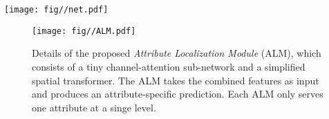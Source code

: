 \documentclass[10pt,twocolumn,letterpaper]{article}
\begin{document}
\begin{figure*}[t]
  \begin{center}
    \texttt{[image: fig//net.pdf]}
  \end{center}
  \vspace{-1mm}
     \caption{Overview of the proposed framework.
     The input pedestrian image is fed into the main network with both bottom-up and top-down pathways.
     Features combined from different levels are fed into multiple \textit{Attribute Localization Modules} (Figure \ref{fig:ALM}),
     which perform attribute-specific localization and region-based feature learning.
     Outputs from different branches are trained with \textit{deep supervision} and aggregated through an element-wise maximum operation for inference.
      is the total number of attributes. Best viewed in color.}
  \label{fig:framework}
\end{figure*}

\begin{figure}[t]
  \begin{center}
    \texttt{[image: fig//ALM.pdf]}
  \end{center}
  \vspace{-2mm}
     \caption{Details of the proposed \textit{Attribute Localization Module} (ALM), which consists of a tiny channel-attention sub-network and a simplified spatial transformer.
     The ALM takes the combined features  as input and produces an attribute-specific prediction.
     Each ALM only serves one attribute at a singe level.}
  \label{fig:ALM}
\end{figure}
\end{document}
